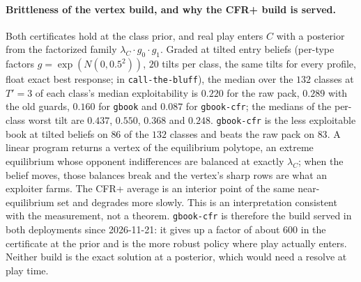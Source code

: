 \documentclass[11pt]{article}
\theoremstyle{plain}
\theoremstyle{definition}
\theoremstyle{remark}
\newcommand{\code}[1]{\texttt{\small #1}}
\begin{document}
\paragraph{Brittleness of the vertex build, and why the CFR+ build is
served.} Both certificates hold at the class prior, and real play
enters $C$ with a posterior from the factorized family
$\lambda_C\cdot g_0\cdot g_1$. Graded at tilted entry beliefs (per-type
factors $g=\exp(N(0,0.5^2))$, $20$ tilts per class, the same tilts for
every profile, float exact best response;
 in
\code{call-the-bluff}), the median over the $132$ classes at $T'=3$ of
each class's median exploitability is $0.220$ for the raw pack, $0.289$
with the old guards, $0.160$ for \code{gbook} and $0.087$ for
\code{gbook-cfr}; the medians of the per-class worst tilt are $0.437$,
$0.550$, $0.368$ and $0.248$. \code{gbook-cfr} is the less exploitable
book at tilted beliefs on $86$ of the $132$ classes and beats the raw
pack on $83$. A linear program returns a vertex of the equilibrium
polytope, an extreme equilibrium whose opponent indifferences are
balanced at exactly $\lambda_C$; when the belief moves, those balances
break and the vertex's sharp rows are what an exploiter farms. The
CFR+ average is an interior point of the same near-equilibrium set and
degrades more slowly. This is an interpretation consistent with the
measurement, not a theorem. \code{gbook-cfr} is therefore the build
served in both deployments since 2026-11-21: it gives up a factor of
about $600$ in the certificate at the prior and is the more robust
policy where play actually enters. Neither build is the exact solution
at a posterior, which would need a resolve at play time.
\end{document}
